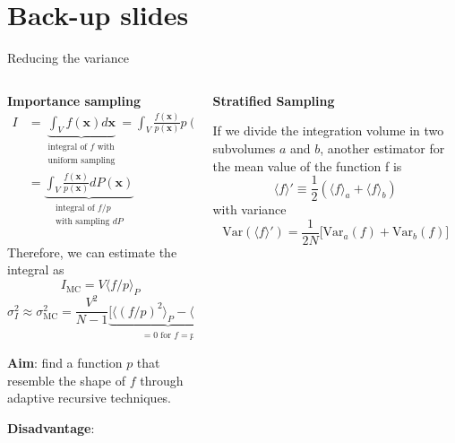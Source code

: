 \documentclass[t,handout,professionalfont,serif]{beamer}
\begin{document}
\section{Back-up slides}
\begin{frame}{Reducing the variance}
	\tiny
	\begin{columns}
		\begin{column}{0.5 \textwidth}
			\textbf{Importance sampling}
			\begin{align*}
				I & = \underbrace{\int_{V}   f(\textbf{x})  d \textbf{x}}_{\substack{\text{integral of } f  \text{ with} \\ \text{uniform sampling}}}  =\int_{V}   \frac{f(\textbf{x})}{ p(\textbf{x})} p(\textbf{x})  d\textbf{x} \\
				& =\underbrace{\int_{V}  \frac{f(\textbf{x})}{ p(\textbf{x})} dP(\textbf{x}) }_{\substack{\text{integral of } f/p \\ \text{with sampling } dP}} 
			\end{align*}
			
			
			Therefore, we can estimate the integral as
			\begin{equation*}
				I_\text{MC}= V \langle f/p \rangle_P 
			\end{equation*}
			\begin{equation*}
				\sigma^2_I \approx \sigma^2_\text{MC} = \frac{V^2}{N-1} \underbrace{\bigg[\langle (f/p)^2 \rangle_P - \langle f/p \rangle^2_P \bigg] }_{\substack{= 0 \text{ for } f = p}}
			\end{equation*}
			
			\textbf{Aim}: find a function $p$ that resemble the shape of $f$ through adaptive recursive techniques.
			
			\vspace{0.05cm}
			
			\textbf{Disadvantage}:
		\end{column}
		\begin{column}{0.5 \textwidth}
			\textbf{Stratified Sampling}
			
			\vspace{0.3cm}
			If we divide the integration volume in two subvolumes $a$ and $b$, another estimator for the mean value of the function f is 
			\begin{equation*}
				\langle f  \rangle ' \equiv \frac{1}{2} (  \langle f \rangle_a + \langle f \rangle_b ) 
			\end{equation*}
			with variance
			\begin{equation*}
				\text{Var}(\langle f \rangle ') = \dfrac{1}{2N} \big[ \text{Var}_a(f) + \text{Var}_b(f)\big] 
			\end{equation*}
			

\end{column}
\end{columns}
\end{frame}
\end{document}
